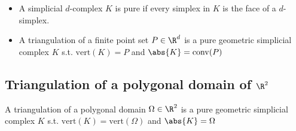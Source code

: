 \begin{itemize}
    \item A simplicial $d$-complex $K$ is pure if every simplex in $K$ is the face of a $d$-simplex.
    \item A triangulation of a finite point set $P \in \R^d$ is a pure geometric simplicial complex $K$ s.t. $\mathrm{vert}(K) = P$ and $\abs{K} = \mathrm{conv}(P)$
\end{itemize}

\subsection{Triangulation of a polygonal domain of \texorpdfstring{$\R^2$}{R2}}

A triangulation of a polygonal domain $\Omega \in \R^2$ is a pure geometric simplicial complex $K$ s.t. $\mathrm{vert}(K) = \mathrm{vert}(\Omega)$ and $\abs{K} = \Omega$